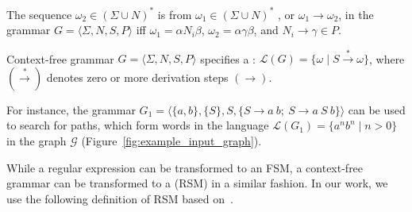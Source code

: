
\begin{definition}
The sequence $\omega_2 \in (\Sigma \cup N)^*$ is  from $\omega_1 \in (\Sigma \cup N)^*$ , or $\omega_1 \to \omega_2$, in the grammar $G = \langle\Sigma, N, S, P\rangle$ iff $\omega_1=\alpha N_i \beta$, $\omega_2 = \alpha \gamma \beta$, and $N_i \to \gamma \in P$.
\end{definition}

\begin{definition}
Context-free grammar $G=\langle\Sigma, N, S, P\rangle$ specifies a : $\mathcal{L}(G) = \{\omega \mid S \xrightarrow{*} \omega \}$, where $(\xrightarrow{*})$ denotes zero or more derivation steps $(\to)$.
\end{definition}

For instance, the grammar $G_1 = \langle \{a,b\}, \{S\}, S, \{S \to a \ b; \ S \to a \ S \ b\} \rangle$ can be used to search for paths, which form words in the language $\mathcal{L}(G_1) = \{a^n b^n \mid n > 0\}$ in the graph $\mathcal{G}$ (Figure~\ref{fig:example_input_graph}).


While a regular expression can be transformed to an FSM, a context-free grammar can be transformed to a  (RSM) in a similar fashion.
In our work, we use the following definition of RSM based
on~\cite{rsm:analysis:10.1007/3-540-44585-4_18}.


